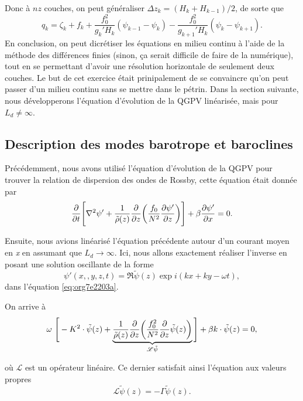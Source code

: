 \documentclass[10pt]{article}
\numberwithin{equation}{section}
\newcommand{\tpsi}{\tilde{\psi}}
\begin{document}
Donc à \(nz\) couches, on peut généraliser \(\Delta z_k = (H_k + H_{k-1})/2\), de sorte que
\begin{equation}
\label{eq:orgd71ae25}
q_k = \zeta_k + f_k + \frac{f_0^2}{g_k' H_k}(\psi_{k-1} - \psi_k) - \frac{f_0^2}{g_{k+1}' H_k}(\psi_k - \psi_{k+1}).
\end{equation}
En conclusion, on peut dicrétiser les équations en milieu continu à l'aide de la méthode des différences finies (sinon, ça serait difficile de faire de la numérique), tout en se permettant d'avoir une résolution horizontale de seulement deux couches.
Le but de cet exercice était prinipalement de se convaincre qu'on peut passer d'un milieu continu sans se mettre dans le pétrin.
Dans la section suivante, nous développerons l'équation d'évolution de la QGPV linéarisée, mais pour \(L_d \not = \infty\).
\subsection{Description des modes barotrope et baroclines}
\label{sec:org6eaa1f6}
Précédemment, nous avons utilisé l'équation d'évolution de la QGPV pour trouver la relation de dispersion des ondes de Rossby, cette équation était donnée par
\begin{equation}
\label{eq:org7e2203a}
\pdv{t} \Bigg[ \laplacian \psi' + \frac{1}{\tilde{\rho}(z)}\pdv{z}\qty(\frac{f_0}{N^2}\pdv{\psi'}{z}) \Bigg] + \beta \pdv{\psi'}{x} = 0.
\end{equation}

Ensuite, nous avions linéarisé l'équation précédente autour d'un courant moyen en \emph{x} en assumant que \(L_d \rightarrow \infty\).
Ici, nous allons exactement réaliser l'inverse en posant une solution oscillante de la forme
\begin{equation}
\psi'(x,,y,z,t) = \Re \tpsi(z) \exp{ i(kx + ky - \omega t)},
\end{equation}
dans l'équation \ref{eq:org7e2203a}.\bigskip

On arrive à
\begin{equation}
\label{eq:org750f59c}
\omega\ \Bigg[ - K^2 \cdot \tpsi(z) + \underbrace{\frac{1}{\tilde{\rho}(z)}\pdv{z}\qty(\frac{f_0^2}{N^2} \pdv{z}\tpsi(z))}_{\mathscr{L}\tpsi} \Bigg] + \beta k\cdot \tpsi(z) = 0,
\end{equation}

où \(\mathscr{L}\) est un opérateur linéaire.
Ce dernier satisfait ainsi l'équation aux valeurs propres
\begin{equation}
\mathscr{L}\tpsi(z) = - \Gamma \tpsi(z).
\end{equation}
\end{document}
